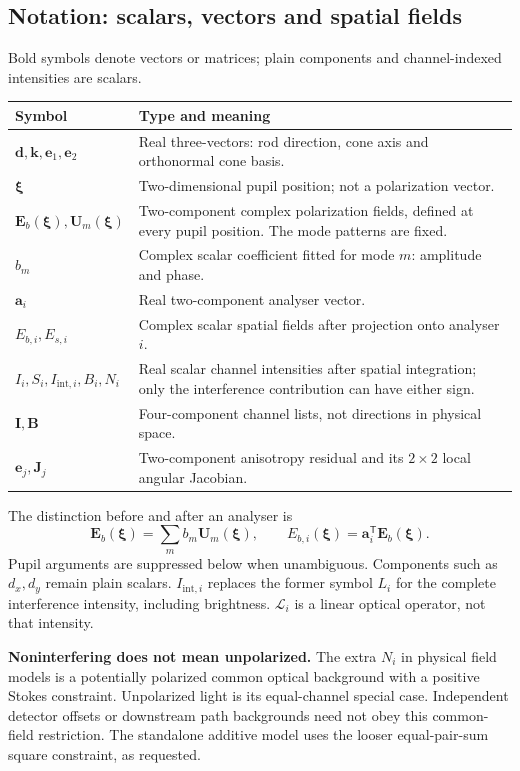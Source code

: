 \documentclass[10pt,a4paper]{article}
\begin{document}
\subsection*{Notation: scalars, vectors and spatial fields}
Bold symbols denote vectors or matrices; plain components and channel-indexed intensities are scalars.
\begin{center}\begin{tabular}{lp{112mm}}\toprule
Symbol & Type and meaning\\\midrule
$\mathbf d,\mathbf k,\mathbf e_1,\mathbf e_2$ & Real three-vectors: rod direction, cone axis and orthonormal cone basis.\\
$\boldsymbol\xi$ & Two-dimensional pupil position; not a polarization vector.\\
$\mathbf E_b(\boldsymbol\xi),\mathbf U_m(\boldsymbol\xi)$ & Two-component complex polarization fields, defined at every pupil position. The mode patterns are fixed.\\
$b_m$ & Complex scalar coefficient fitted for mode $m$: amplitude and phase.\\
$\mathbf a_i$ & Real two-component analyser vector.\\
$E_{b,i},E_{s,i}$ & Complex scalar spatial fields after projection onto analyser $i$.\\
$I_i,S_i,I_{\mathrm{int},i},B_i,N_i$ & Real scalar channel intensities after spatial integration; only the interference contribution can have either sign.\\
$\mathbf I,\mathbf B$ & Four-component channel lists, not directions in physical space.\\
$\mathbf e_j,\mathbf J_j$ & Two-component anisotropy residual and its $2\times2$ local angular Jacobian.\\\bottomrule
\end{tabular}\end{center}
The distinction before and after an analyser is
\[
\mathbf E_b(\boldsymbol\xi)=\sum_m b_m\mathbf U_m(\boldsymbol\xi),\qquad
E_{b,i}(\boldsymbol\xi)=\mathbf a_i^{\mathsf T}\mathbf E_b(\boldsymbol\xi).
\]
Pupil arguments are suppressed below when unambiguous. Components such as $d_x,d_y$ remain plain scalars. $I_{\mathrm{int},i}$ replaces the former symbol $L_i$ for the complete interference intensity, including brightness. $\mathcal{L}_i$ is a linear optical operator, not that intensity.

\textbf{Noninterfering does not mean unpolarized.} The extra $N_i$ in physical field models is a potentially polarized common optical background with a positive Stokes constraint. Unpolarized light is its equal-channel special case. Independent detector offsets or downstream path backgrounds need not obey this common-field restriction. The standalone additive model uses the looser equal-pair-sum square constraint, as requested.
\end{document}
